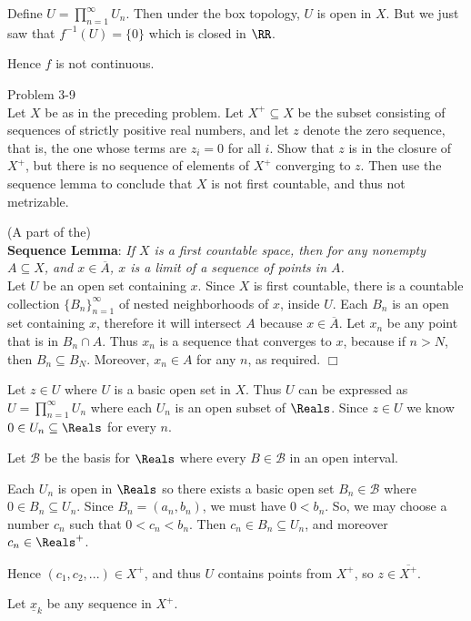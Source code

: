 \documentclass{homework651}
\newcommand\nextprob{\newpage}
\newcommand\calB{\mathcal{B}}
\begin{document}
\begin{aproblems}
Define $U=\prod_{n=1}^{\infty} U_n$.  Then under the box topology, $U$ is open
in $X$.  But we just saw that $f^{-1}(U) = \{0\}$ which is closed in $\RR$.

Hence $f$ is not continuous.

\nextprob
\hproblem Problem 3-9\\
Let $X$ be as in the preceding problem.  Let $X^+\subseteq X$ be the subset
consisting of sequences of strictly positive real numbers, and let $z$ denote
the zero sequence, that is, the one whose terms are $z_i=0$ for all $i$.
Show that $z$ is in the closure of $X^+$, but there is no sequence of elements
of $X^+$ converging to $z$.  Then use the sequence lemma to conclude that $X$
is not first countable, and thus not metrizable.

(A part of the)\\
\textbf{Sequence Lemma}:
\textit{If $X$ is a first countable space, then for any nonempty $A\subseteq X$, and
$x\in\overline{A}$, $x$ is a limit of a sequence of
points in $A$.}\\
Let $U$ be an open set containing $x$.
Since $X$ is first countable, there is a countable
collection $\{B_n\}_{n=1}^{\infty}$ of nested neighborhoods of $x$, inside $U$.
Each $B_n$ is an open set containing $x$, therefore it will intersect $A$
because $x\in\overline{A}$.
Let $x_n$ be any point that is in $B_n\cap A$.  Thus $x_n$ is
a sequence that converges to $x$, because if $n>N$, then $B_n\subseteq B_N$.
Moreover, $x_n\in A$ for any $n$, as required.
\hfill$\Box$

\solution
Let $z\in U$ where $U$ is a basic open set in $X$. Thus $U$ can be
expressed as $U=\prod_{n=1}^{\infty} U_n$ where each $U_n$ is an open
subset of $\Reals$.  Since $z\in U$ we know $0\in U_n\subseteq\Reals$
for every $n$.

Let $\calB$ be the basis for $\Reals$ where every $B\in\calB$ in an
open interval.

Each $U_n$ is open in $\Reals$ so there exists a basic open set $B_n\in\calB$
where $0\in B_n\subseteq U_n$.  Since $B_n=(a_n,b_n)$, we must have
$0< b_n$.  So, we may choose a number $c_n$ such that $0< c_n< b_n$.
Then $c_n\in B_n\subseteq U_n$, and moreover $c_n\in\Reals^+$.

Hence $(c_1,c_2,...)\in X^+$, and thus $U$ contains points from $X^+$,
so $z\in \overline{X^+}$.

\vspace{.2in}

Let $\underline{x}_k$ be any sequence in $X^+$.


\end{aproblems}
\end{document}
